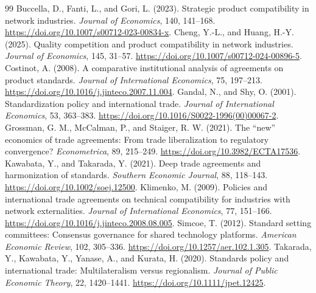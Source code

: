 \documentclass[11pt,a4paper]{article}
\theoremstyle{remark}\newtheorem{remark}[theorem]{Remark}
\begin{document}
\begin{thebibliography}{99}\small
{} Buccella, D., Fanti, L., and Gori, L. (2023). Strategic product compatibility in network industries. \emph{Journal of Economics}, 140, 141--168. \url{https://doi.org/10.1007/s00712-023-00834-x}.
 Cheng, Y.-L., and Huang, H.-Y. (2025). Quality competition and product compatibility in network industries. \emph{Journal of Economics}, 145, 31--57. \url{https://doi.org/10.1007/s00712-024-00896-5}.
 Costinot, A. (2008). A comparative institutional analysis of agreements on product standards. \emph{Journal of International Economics}, 75, 197--213. \url{https://doi.org/10.1016/j.jinteco.2007.11.004}.
 Gandal, N., and Shy, O. (2001). Standardization policy and international trade. \emph{Journal of International Economics}, 53, 363--383. \url{https://doi.org/10.1016/S0022-1996(00)00067-2}.
 Grossman, G. M., McCalman, P., and Staiger, R. W. (2021). The ``new'' economics of trade agreements: From trade liberalization to regulatory convergence? \emph{Econometrica}, 89, 215--249. \url{https://doi.org/10.3982/ECTA17536}.
 Kawabata, Y., and Takarada, Y. (2021). Deep trade agreements and harmonization of standards. \emph{Southern Economic Journal}, 88, 118--143. \url{https://doi.org/10.1002/soej.12500}.
 Klimenko, M. (2009). Policies and international trade agreements on technical compatibility for industries with network externalities. \emph{Journal of International Economics}, 77, 151--166. \url{https://doi.org/10.1016/j.jinteco.2008.08.005}.
 Simcoe, T. (2012). Standard setting committees: Consensus governance for shared technology platforms. \emph{American Economic Review}, 102, 305--336. \url{https://doi.org/10.1257/aer.102.1.305}.
 Takarada, Y., Kawabata, Y., Yanase, A., and Kurata, H. (2020). Standards policy and international trade: Multilateralism versus regionalism. \emph{Journal of Public Economic Theory}, 22, 1420--1441. \url{https://doi.org/10.1111/jpet.12425}.
\end{thebibliography}
\end{document}
